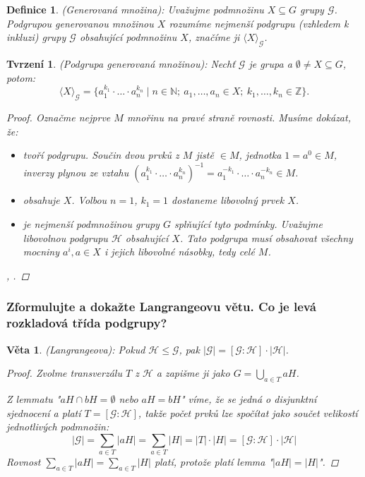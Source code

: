 \documentclass[10pt,a4paper]{article}
\newtheorem{veta}{Věta}
\newtheorem{definice}{Definice}
\newtheorem{tvrzeni}{Tvrzení}
\newcommand{\N}{{\mathbb{N}}}       %
\newcommand{\Z}{{\mathbb{Z}}}       %
\begin{document}
\begin{definice} (Generovaná množina): \normalfont
    Uvažujme podmnožinu $X \subseteq G$ grupy $\mathcal{G}$.
    Podgrupou generovanou množinou $X$ rozumíme nejmenší podgrupu (vzhledem k inkluzi) grupy $\mathcal{G}$ obsahující podmnožinu $X$, značíme ji $\langle X\rangle_\mathcal{G}$.
\end{definice}

\begin{tvrzeni} (Podgrupa generovaná množinou): \normalfont
    Nechť $\mathcal{G}$ je grupa a $\emptyset \neq X \subseteq G$, potom:
    \[
        \langle X \rangle_{\mathcal{G}}=\{a_1^{k_1}\cdot \ldots \cdot a_n^{k_n} \mid n\in \N;~ a_1, \ldots, a_n \in X; ~ k_1, \ldots, k_n \in \Z\}.
    \]
    \begin{proof}
        Označme nejprve $M$ mnořinu na pravé straně rovnosti. Musíme dokázat, že:
        \begin{itemize}
            \item \textit{tvoří podgrupu.} Součin dvou prvků z $M$ jistě $\in M$, jednotka $1=a^0 \in M$, inverzy plynou ze vztahu $(a_1^{k_1}\cdot \ldots \cdot a_n^{k_n})^{-1}=a_1^{-k_1}\cdot \ldots \cdot a_n^{-k_n} \in M$.
            \item \textit{obsahuje $X$.} Volbou $n = 1$, $k_1 = 1$ dostaneme libovolný prvek $X$.
            \item \textit{je nejmenší podmnožinou grupy $G$ splňující tyto podmínky.} 
            Uvažujme libovolnou podgrupu $\mathcal{H}$ obsahující $X$. Tato podgrupa musí obsahovat všechny mocniny $a^i, a\in X$ i jejich libovolné násobky, tedy celé $M$.
        \end{itemize}, .
    \end{proof}
\end{tvrzeni}

\subsubsection{Zformulujte a dokažte Langrangeovu větu. Co je levá rozkladová třída podgrupy?}

\begin{veta} (Langrangeova): \normalfont
    Pokud $\mathcal{H} \leq \mathcal{G}$, pak $|\mathcal{G}| = [\mathcal{G}:\mathcal{H}]\cdot |\mathcal{H}|$.
    \begin{proof}
        Zvolme transverzálu $T$ z $\mathcal{H}$ a zapišme ji jako $\displaystyle G = \bigcup_{a\in T}aH$.

        Z lemmatu "$aH\cap bH = \emptyset$ nebo $aH=bH$" víme, že se jedná o disjunktní sjednocení a platí $T=[\mathcal{G}:\mathcal{H}]$, takže počet prvků lze spočítat jako součet velikostí jednotlivých podmnožin:
        \[
            |\mathcal{G}| = \sum_{a\in T}|aH|=\sum_{a\in T}|H| = |T| \cdot |H|=[\mathcal{G}:\mathcal{H}]\cdot |\mathcal{H}|
        \]
        Rovnost $\displaystyle\sum_{a\in T}|aH|=\sum_{a\in T}|H|$ platí, protože platí lemma "$|aH| = |H|$".
    \end{proof}
\end{veta}
\end{document}
